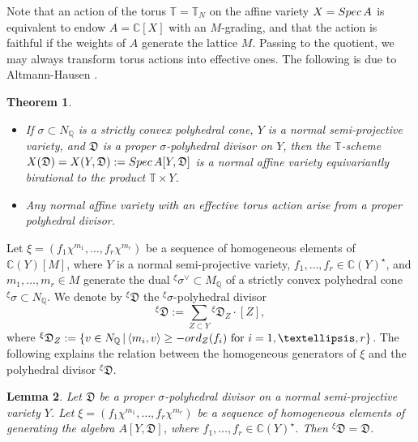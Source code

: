 \documentclass[11pt, reqno]{amsart}
\theoremstyle{plain}
\newtheorem{theorem}{Theorem}[section]
\newtheorem{lemma}[theorem]{Lemma}
\theoremstyle{definition}
\theoremstyle{remark}
\begin{document}
Note  that an action of the torus $\mathbb{T} =  \mathbb{T}_{N}$ on the affine variety $X  =  {\rm Spec}\, A$ is equivalent to endow 
$A  =  \mathbb{C}[X]$ with an $M$-grading, and that the action is faithful if the weights of $A$ generate the lattice $M$.  Passing to the quotient, we may always transform torus actions into effective ones. The following is due 
to Altmann-Hausen \cite[Theorem 7]{AIPSV12}.
\begin{theorem}
\begin{itemize}
\item[(1)] If $\sigma\subset N_{\mathbb{Q}}$ is a strictly convex polyhedral cone, $Y$ is a normal semi-projective variety,
and $\mathfrak{D}$ is a proper $\sigma$-polyhedral divisor on $Y$, then the $\mathbb{T}$-scheme $X(\mathfrak{D}) =  X(Y, \mathfrak{D}):= {\rm Spec}\, A[Y, \mathfrak{D}]$ is a normal affine variety equivariantly birational to the product $\mathbb{T}\times Y$. 
\item[(2)] Any normal affine variety with an effective  torus action arise from a proper polyhedral divisor.
\end{itemize}
\end{theorem}
Let $\xi =  (f_{1}\chi^{m_{1}}, \ldots, f_{r}\chi^{m_{r}})$ be a sequence of homogeneous elements of
$\mathbb{C}(Y)[M]$, where $Y$ is a normal semi-projective variety, $f_{1}, \ldots, f_{r}\in \mathbb{C}(Y)^{\star}$,
and $m_{1}, \ldots, m_{r}\in M$ generate the dual  ${}^{\xi}\sigma^{\vee}\subset  M_{\mathbb{Q}}$ of a strictly convex polyhedral cone ${}^{\xi}\sigma \subset N_{\mathbb{Q}}$. We denote by ${}^{\xi}\mathfrak{D}$ the ${}^{\xi}\sigma$-polyhedral divisor 
$${}^{\xi}\mathfrak{D} :=  \sum_{Z\subset Y} {}^{\xi}\mathfrak{D}_{Z}\cdot [Z],$$
where ${}^{\xi}\mathfrak{D} _{Z}:= \{v\in N_{\mathbb{Q}}\,  |\, \langle m_{i}, v\rangle \geq -{\rm ord}_{Z}(f_{i}) \text{ for }i=1, \ldots, r\}$. The following explains the relation between the homogeneous generators of $\xi$ and the polyhedral divisor ${}^{\xi}\mathfrak{D}$.
\begin{lemma}\label{lem0-gen}
Let $\mathfrak{D}$ be a proper $\sigma$-polyhedral divisor on a normal semi-projective variety $Y$. Let $\xi =  (f_{1}\chi^{m_{1}}, \ldots, f_{r}\chi^{m_{r}})$ be a sequence of homogeneous elements of  generating the algebra 
$A[Y, \mathfrak{D}]$, where $f_{1}, \ldots, f_{r}\in \mathbb{C}(Y)^{\star}$. Then ${}^{\xi}\mathfrak{D} =  \mathfrak{D}$. 
\end{lemma}
\end{document}
